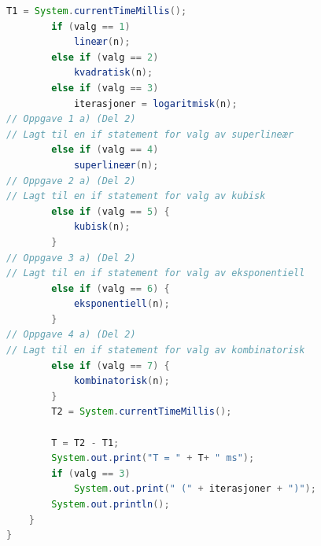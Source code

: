 \documentclass[twocolumn]{article}
\begin{document}
\begin{lstlisting}[language=Java, frame=single]
        T1 = System.currentTimeMillis();
        if (valg == 1)
            lineær(n);
        else if (valg == 2)
            kvadratisk(n);
        else if (valg == 3)
            iterasjoner = logaritmisk(n);
// Oppgave 1 a) (Del 2)
// Lagt til en if statement for valg av superlineær
        else if (valg == 4)
            superlineær(n);
// Oppgave 2 a) (Del 2)
// Lagt til en if statement for valg av kubisk
        else if (valg == 5) {
            kubisk(n);
        }
// Oppgave 3 a) (Del 2)
// Lagt til en if statement for valg av eksponentiell
        else if (valg == 6) {
            eksponentiell(n);
        }
// Oppgave 4 a) (Del 2)
// Lagt til en if statement for valg av kombinatorisk
        else if (valg == 7) {
            kombinatorisk(n);
        }
        T2 = System.currentTimeMillis();

        T = T2 - T1;
        System.out.print("T = " + T+ " ms");
        if (valg == 3)
            System.out.print(" (" + iterasjoner + ")");
        System.out.println();
    }
}
\end{lstlisting}
\end{document}
